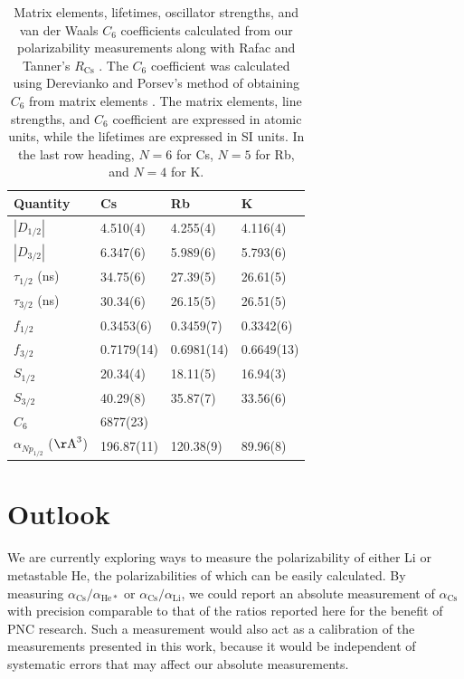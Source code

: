 \documentclass[twocolumn,prl,showpacs,superscriptaddress]{revtex4-1}   %
\newcommand{\acs}{\alpha_{\textrm{Cs}}}
\newcommand{\AAA}{\mathrm{\AA}}
\begin{document}
\begingroup
\begin{table}
\caption{\label{tableMisc}Matrix elements, lifetimes, oscillator strengths, and van der Waals $C_6$ coefficients calculated from our polarizability measurements along with Rafac and Tanner's $R_{\mathrm{Cs}}$ \cite{Rafac1998}. The $C_6$ coefficient was calculated using Derevianko and Porsev's method of obtaining $C_6$ from matrix elements \cite{Derevianko2001}. The matrix elements, line strengths, and $C_6$ coefficient are expressed in atomic units, while the lifetimes are expressed in SI units. In the last row heading, $N=6$ for Cs, $N=5$ for Rb, and $N=4$ for K.}
\begin{center}
\begin{tabular}{l l l l}
\hline\hline
Quantity & Cs & Rb & K \\
\hline
$\left|D_{1/2}\right|$	& 4.510(4) & 4.255(4) & 4.116(4) \\
$\left|D_{3/2}\right|$	& 6.347(6) & 5.989(6) & 5.793(6) \\
$\tau_{1/2}$ (ns)		& 34.75(6) & 27.39(5) & 26.61(5) \\
$\tau_{3/2}$ (ns)		& 30.34(6) & 26.15(5) & 26.51(5) \\
$f_{1/2}$				& 0.3453(6) & 0.3459(7) & 0.3342(6) \\
$f_{3/2}$				& 0.7179(14) & 0.6981(14) & 0.6649(13) \\
$S_{1/2}$ 				& 20.34(4) & 18.11(5) & 16.94(3) \\
$S_{3/2}$ 				& 40.29(8) & 35.87(7) & 33.56(6) \\
$C_6$					& 6877(23) & & \\
$\alpha_{Np_{1/2}}$ ($\AAA^3$)		& 196.87(11) & 120.38(9) & 89.96(8) \\
\hline\hline
\end{tabular}
\end{center}
\end{table}
\endgroup

\section{Outlook}

We are currently exploring ways to measure the polarizability of either Li or metastable He, the polarizabilities of which can be easily calculated. By measuring $\acs/\alpha_{\mathrm{He*}}$ or $\acs/\alpha_{\mathrm{Li}}$, we could report an absolute measurement of $\acs$ with precision comparable to that of the ratios reported here for the benefit of PNC research. Such a measurement would also act as a calibration of the measurements presented in this work, because it would be independent of systematic errors that may affect our absolute measurements.
\end{document}
